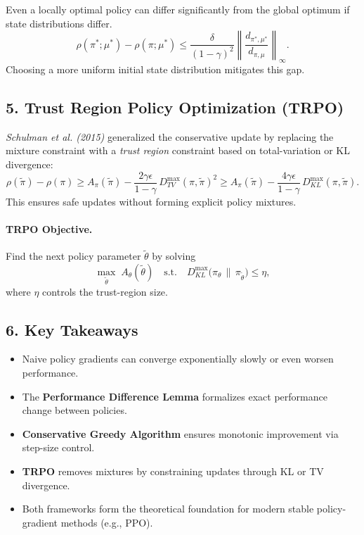 \documentclass[12pt]{article}
\begin{document}
Even a locally optimal policy can differ significantly from the global optimum if state
distributions differ.
\[
		\rho(\pi^*;\mu^*) - \rho(\pi;\mu^*)
		\le \frac{\delta}{(1-\gamma)^2}
		\left\|\frac{d_{\pi^*,\mu^*}}{d_{\pi,\mu}}\right\|_\infty.
\]
Choosing a more uniform initial state distribution mitigates this gap.

\subsection*{5. Trust Region Policy Optimization (TRPO)}

\textit{Schulman et al. (2015)} generalized the conservative update by replacing the
mixture constraint with a \emph{trust region} constraint based on total-variation or KL divergence:
\[
		\rho(\tilde\pi)-\rho(\pi)
		\ge A_\pi(\tilde\pi)
		- \frac{2\gamma\epsilon}{1-\gamma}\, D^{\max}_{TV}(\pi,\tilde\pi)^2
		\ge A_\pi(\tilde\pi)
		- \frac{4\gamma\epsilon}{1-\gamma}\, D^{\max}_{KL}(\pi,\tilde\pi).
\]
This ensures safe updates without forming explicit policy mixtures.

\paragraph{TRPO Objective.}
Find the next policy parameter $\tilde\theta$ by solving
\[
		\max_{\tilde\theta}\; A_\theta(\tilde\theta)
		\quad\text{s.t.}\quad
		D^{\max}_{KL}\big(\pi_\theta\,\|\,\pi_{\tilde\theta}\big)\le \eta,
\]
where $\eta$ controls the trust-region size.

\subsection*{6. Key Takeaways}
\begin{itemize}
  \item Naive policy gradients can converge exponentially slowly or even worsen performance.
		\item The \textbf{Performance Difference Lemma} formalizes exact performance change
				between policies.
  \item \textbf{Conservative Greedy Algorithm} ensures monotonic improvement via step-size control.
  \item \textbf{TRPO} removes mixtures by constraining updates through KL or TV divergence.
		\item Both frameworks form the theoretical foundation for modern stable policy-gradient
				methods (e.g., PPO).
\end{itemize}
\end{document}
